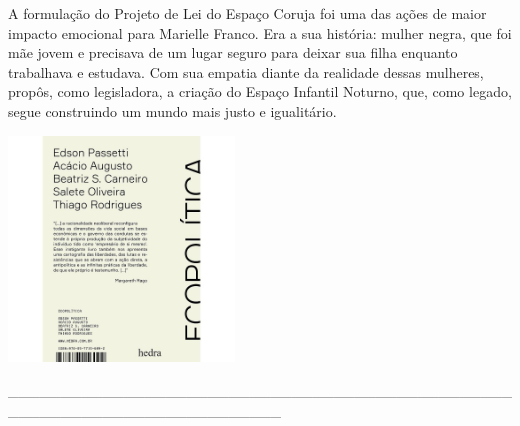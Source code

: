 {\medskip

\noindent{}A formulação do Projeto de Lei do Espaço Coruja foi uma das ações de maior impacto emocional para Marielle Franco. Era a sua história: mulher negra, que foi mãe jovem e precisava de um lugar seguro para deixar sua filha enquanto trabalhava e estudava. Com sua empatia diante da realidade dessas mulheres, propôs, como legisladora, a criação do Espaço Infantil Noturno, que, como legado, segue construindo um mundo mais justo e igualitário.

\hspace{.5cm}

\hspace*{-.4cm}\begin{minipage}[c]{0.90\linewidth}
\small{
{}}
\end{minipage}

\pagebreak

\hspace{.5cm}

\begin{center}
\hspace*{-.5cm}\includegraphics[width=60mm]{eco.jpeg}
\end{center}

\hspace*{-2cm}\_\_\_\_\_\_\_\_\_\_\_\_\_\_\_\_\_\_\_\_\_\_\_\_\_\_\_\_\_\_\_\_\_\_\_\_\_\_\_\_\_\_\_\_\_\_\_\_\_\_\_\_\_\_\_\_\_\_\_\_\_\_\_\_\_\_\_\_\_\_\_\_\_\_

\medskip

}
